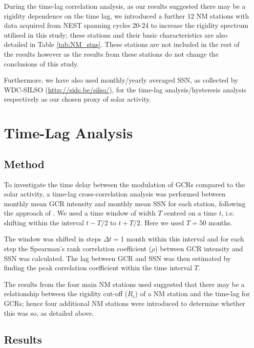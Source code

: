 During the time-lag correlation analysis, as our results suggested there may be a rigidity dependence on the time lag, we introduced a further 12 NM stations with data acquired from NEST spanning cycles 20-24 to increase the rigidity spectrum utilised in this study; these stations and their basic characteristics are also detailed in Table \ref{tab:NM_stns}. These stations are not included in the rest of the results however as the results from these stations do not change the conclusions of this study.

Furthermore, we have also used monthly/yearly averaged SSN, as collected by WDC-SILSO (\url{http://sidc.be/silso/}), for the time-lag analysis/hysteresis analysis respectively as our chosen proxy of solar activity.


\section{Time-Lag Analysis}
\label{sec:lag}

\subsection{Method}
\label{TL-Method} 
To investigate the time delay between the modulation of GCRs compared to the solar activity, a time-lag cross-correlation analysis was performed between monthly mean GCR intensity and monthly mean SSN for each station, following the approach of \citet{usoskin_correlative_1998}. We used a time window of width $T$ centred on a time $t$, i.e. shifting within the interval $t-T/2$ to $t+T/2$. Here we used $T = 50$ months.

The window was shifted in steps $\Delta t = 1$ month within this interval and for each step the Spearman's rank correlation coefficient ($\rho$) between GCR intensity and SSN was calculated. The lag between GCR and SSN was then estimated by finding the peak correlation coefficient within the time interval $T$.

The results from the four main NM stations used suggested that there may be a relationship between the rigidity cut-off ($R_c$) of a NM station and the time-lag for GCRs; hence four additional NM stations were introduced to determine whether this was so, as detailed above.



\subsection{Results}

